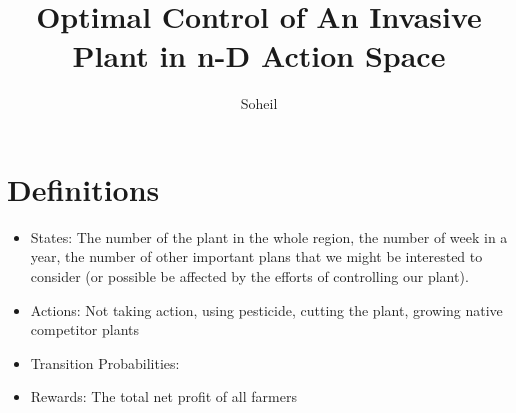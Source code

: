 \documentclass{article}
\title{ Optimal Control of An Invasive Plant in n-D Action Space}
\author{Soheil}
\date{}
\theoremstyle{remark}
\theoremstyle{remark}
\theoremstyle{remark}
\theoremstyle{remark}
\theoremstyle{remark}
\theoremstyle{remark}
\begin{document}
\maketitle
\section{Definitions}
\begin{itemize}
 \item States: The number of the plant in the whole region, the number of week in a year, the number of other important plans that we might be interested to consider (or possible be affected by the efforts of controlling our plant).
 
 \item Actions: Not taking action, using pesticide, cutting the plant, growing native competitor plants
 \item Transition Probabilities:
 \item Rewards: The total net profit of all farmers
\end{itemize}
\end{document}
